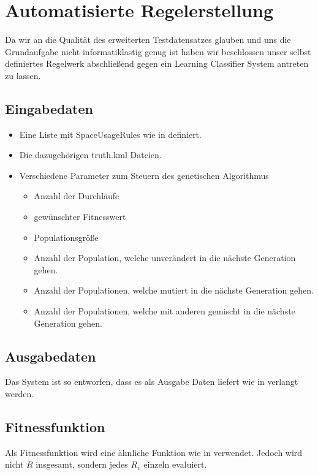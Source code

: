 \section{Automatisierte Regelerstellung}
Da wir an die Qualität des erweiterten Testdatensatzes glauben und uns die Grundaufgabe nicht informatiklastig genug ist
haben wir beschlossen unser selbst definiertes Regelwerk abschließend gegen ein Learning Classifier System antreten zu lassen.
\subsection{Eingabedaten}
\begin{itemize}
\item Eine Liste mit SpaceUsageRules wie in  definiert.
\item Die dazugehörigen truth.kml Dateien.
\item Verschiedene Parameter zum Steuern des genetischen Algorithmus \begin{itemize}
\item Anzahl der Durchläufe
\item gewünschter Fitnesswert
\item Populationsgröße
\item Anzahl der Population, welche unverändert in die nächste Generation gehen.
\item Anzahl der Populationen, welche mutiert in die nächste Generation gehen.
\item Anzahl der Populationen, welche mit anderen gemischt in die nächste Generation gehen.
\end{itemize}
\end{itemize}
\subsection{Ausgabedaten}
Das System ist so entworfen, dass es als Ausgabe Daten liefert wie in  verlangt werden.
\subsection{Fitnessfunktion}
Als Fitnessfunktion wird eine ähnliche Funktion wie in  verwendet. Jedoch wird nicht $R$ insgesamt, sondern jedes $R_v$ einzeln evaluiert.